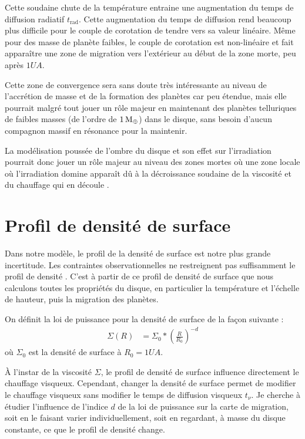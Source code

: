Cette soudaine chute de la température entraine une augmentation du temps de diffusion radiatif $t_\text{rad}$. Cette augmentation du temps de diffusion rend beaucoup plus difficile pour le couple de corotation de tendre vers sa valeur linéaire. Même pour des masse de planète faibles, le couple de corotation est non-linéaire et fait apparaître une zone de migration vers l'extérieur au début de la zone morte, peu après $1\unit{UA}$. 

Cette zone de convergence sera sans doute très intéressante au niveau de l'accrétion de masse et de la formation des
planètes car peu étendue, mais elle pourrait malgré tout jouer un rôle majeur en maintenant des planètes telluriques de faibles
masses (de l'ordre de $1\mathrm{\thinspace M_\oplus}$) dans le disque, sans besoin d'aucun compagnon massif en résonance pour la maintenir.

La modélisation poussée de l'ombre du disque et son effet sur l'irradiation pourrait donc jouer un rôle majeur au niveau des
zones mortes où une zone locale où l'irradiation domine apparaît dû à la décroissance soudaine de la viscosité et du chauffage
qui en découle \citep{matsumura2003origin}.

\section{Profil de densité de surface}
Dans notre modèle, le profil de la densité de surface est notre plus grande incertitude. Les contraintes observationnelles ne
restreignent pas suffisamment le profil de densité \citep[Fig. 12]{mundy2000structure, andrews2007high, williams2011protoplanetary,
guilloteau2011dual}. C'est à partir de ce profil de densité de surface que nous calculons toutes les propriétés du disque, en
particulier la température et l'échelle de hauteur, puis la migration des planètes. 

On définit la loi de puissance pour la densité de surface de la façon suivante : 
\begin{align}
\Sigma(R) &= \Sigma_0 * \left(\frac{R}{R_0}\right)^{-d}
\end{align}
où $\Sigma_0$ est la densité de surface à $R_0=1\unit{UA}$.

À l'instar de
la viscosité $\Sigma$, le profil de densité de surface influence directement le chauffage visqueux. Cependant, changer la
densité de surface permet de modifier le chauffage visqueux sans modifier le temps de diffusion visqueux $t_\nu$. Je cherche à
étudier l'influence de l'indice $d$ de la loi de puissance sur la carte de migration, soit en le faisant varier
individuellement, soit en regardant, à masse du disque constante, ce que le profil de densité change. 

